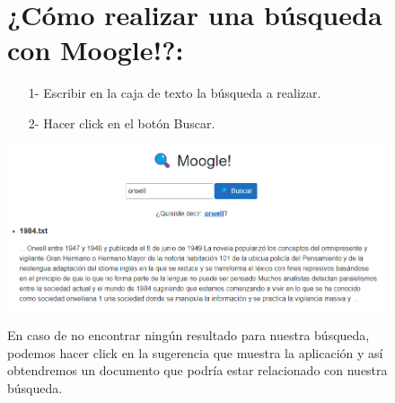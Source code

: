 \documentclass{article}
\begin{document}
\begin{figure}
	\section*{¿Cómo realizar una búsqueda con Moogle!?:}
	\begin{itemize}
		\item[1-] Escribir en la caja de texto la búsqueda a realizar.
		\item[2-] Hacer click en el botón Buscar.
	\end{itemize}

	\includegraphics*[width=16.5cm]{search.jpg}
	\begin{flushleft}
		En caso de no encontrar ningún resultado para nuestra búsqueda, podemos hacer click
		en la sugerencia que muestra la aplicación y así obtendremos un documento que podría
		estar relacionado con nuestra búsqueda.

	\end{flushleft}
\end{figure}
\end{document}
